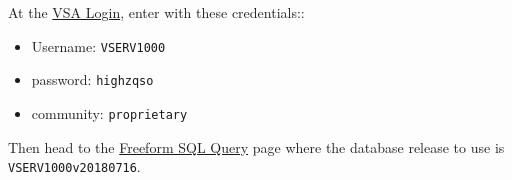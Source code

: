 \documentclass[usenatbib]{mnras}
\begin{document}
At the \href{http://horus.roe.ac.uk/vsa/login.html}{VSA Login}, enter 
with these credentials::
\begin{itemize}
    \item Username: {\tt VSERV1000} 
    \item password: {\tt highzqso} 
    \item community: {\tt proprietary}
\end{itemize}
Then head to the \href{http://horus.roe.ac.uk:8080/vdfs/VSQL_form.jsp}{Freeform SQL Query} page where the database release to use is {\tt VSERV1000v20180716}. 

%






%
%


\end{document}
